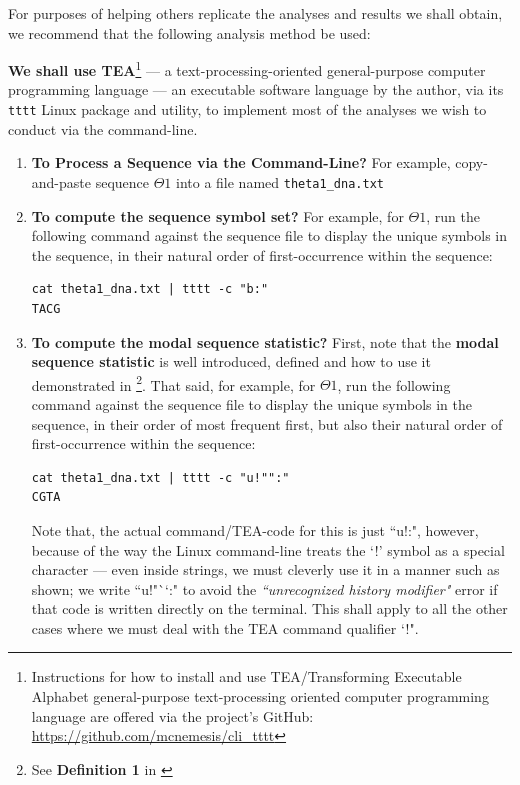 \documentclass[a4paper, 18pt]{book} %
\begin{document}
For purposes of helping others replicate the analyses and results we shall obtain, we recommend that the following analysis method be used: 


\textbf{We shall use TEA}\footnote{Instructions for how to install and use TEA/Transforming Executable Alphabet general-purpose text-processing oriented computer programming language are offered via the project's GitHub: \url{https://github.com/mcnemesis/cli_tttt}}\cite{Lutalo2024_taz}\cite{cli_tttt} --- a text-processing-oriented general-purpose computer programming language --- an executable software language by the author, via its \texttt{tttt} Linux package and utility, to implement most of the analyses we wish to conduct via the command-line.

\begin{enumerate}
\item {\textbf{To Process a Sequence via the Command-Line?} For example, copy-and-paste sequence $\Theta1$ into a file named \texttt{theta1\_dna.txt}}
\item {\textbf{To compute the sequence symbol set?} For example, for $\Theta1$, run the following command against the sequence file to display the unique symbols in the sequence, in their natural order of first-occurrence within the sequence:

\begin{verbatim}
cat theta1_dna.txt | tttt -c "b:"
TACG
\end{verbatim}

}
\item {\textbf{To compute the modal sequence statistic?} First, note that the \textbf{modal sequence statistic} is well introduced, defined and how to use it demonstrated in \cite{transformatics}\footnote{See \textbf{Definition 1} in \cite{transformatics}}. That said, for example, for $\Theta1$, run the following command against the sequence file to display the unique symbols in the sequence, in their order of most frequent first, but also their natural order of first-occurrence within the sequence:

\begin{verbatim}
cat theta1_dna.txt | tttt -c "u!"":"
CGTA
\end{verbatim}
Note that, the actual command/TEA-code for this is just ``u!:", however, because of the way the Linux command-line treats the `!' symbol as a special character --- even inside strings, we must cleverly use it in a manner such as shown; we write ``u!"``:" to avoid the \textit{``unrecognized history modifier"} error if that code is written directly on the terminal. This shall apply to all the other cases where we must deal with the TEA command qualifier `!"\cite{Lutalo2024_taz}.

}
\end{enumerate}
\end{document}
